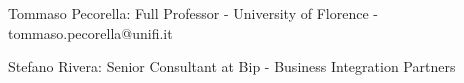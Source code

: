 \begin{cventries}
  \cventry
    {}
    {}
    {}
    {}
    {
      \begin{cvitems}
        \item Tommaso Pecorella: Full Professor - University of Florence - tommaso.pecorella@unifi.it 
     
        \item Stefano Rivera: Senior Consultant at Bip - Business Integration Partners
      \end{cvitems}
    }
\end{cventries}
